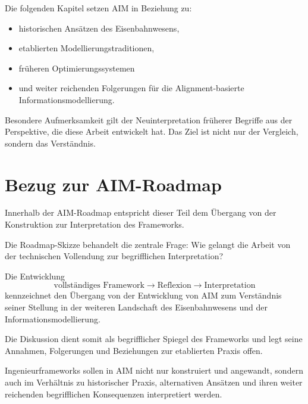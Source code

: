 Die folgenden Kapitel setzen AIM in Beziehung zu:
\begin{itemize}
\item historischen Ansätzen des Eisenbahnwesens,
\item etablierten Modellierungstraditionen,
\item früheren Optimierungssystemen
\item und weiter reichenden Folgerungen für die Alignment-basierte
Informationsmodellierung.
\end{itemize}

Besondere Aufmerksamkeit gilt der Neuinterpretation früherer Begriffe aus
der Perspektive, die diese Arbeit entwickelt hat. Das Ziel ist nicht nur
der Vergleich, sondern das Verständnis.

\section*{Bezug zur AIM-Roadmap}

Innerhalb der AIM-Roadmap entspricht dieser Teil dem Übergang von der
Konstruktion zur Interpretation des Frameworks.

Die Roadmap-Skizze behandelt die zentrale Frage: Wie gelangt die Arbeit
von der technischen Vollendung zur begrifflichen Interpretation?

\begin{center}
\end{center}

Die Entwicklung
\[
\text{vollständiges Framework}
\rightarrow
\text{Reflexion}
\rightarrow
\text{Interpretation}
\]
kennzeichnet den Übergang von der Entwicklung von AIM zum Verständnis
seiner Stellung in der weiteren Landschaft des Eisenbahnwesens und der
Informationsmodellierung.

Die Diskussion dient somit als begrifflicher Spiegel des Frameworks und
legt seine Annahmen, Folgerungen und Beziehungen zur etablierten Praxis
offen.

\begin{principle}[Interpretationsprinzip]
\label{princ:interpretation-principle}
Ingenieurframeworks sollen in AIM nicht nur konstruiert und angewandt,
sondern auch im Verhältnis zu historischer Praxis, alternativen Ansätzen
und ihren weiter reichenden begrifflichen Konsequenzen interpretiert
werden.
\end{principle}

